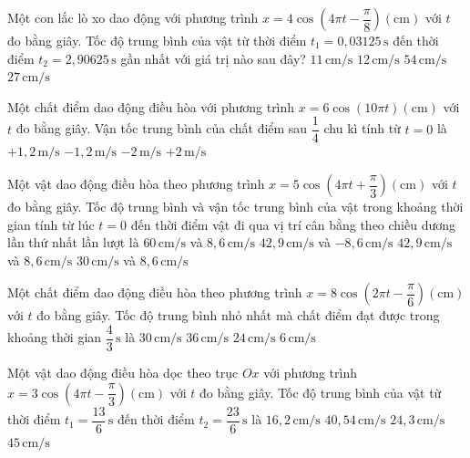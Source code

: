 \begin{ex}
Một con lắc lò xo dao động với phương trình
$x=4\cos\left(4\pi t-\dfrac{\pi}{8}\right) (\mathrm{cm})$
với $t$ đo bằng giây. Tốc độ trung bình của vật từ thời điểm $t_1=0,03125\,\mathrm{s}$ đến thời điểm $t_2=2,90625\,\mathrm{s}$ gần nhất với giá trị nào sau đây?
\choice
{$11\,\mathrm{cm/s}$}
{$12\,\mathrm{cm/s}$}
{$54\,\mathrm{cm/s}$}
{\True $27\,\mathrm{cm/s}$}
\end{ex}

\begin{ex}
Một chất điểm dao động điều hòa với phương trình
$x=6\cos(10\pi t) (\mathrm{cm})$
với $t$ đo bằng giây. Vận tốc trung bình của chất điểm sau $\dfrac{1}{4}$ chu kì tính từ $t=0$ là
\choice
{$+1,2\,\mathrm{m/s}$}
{\True $-1,2\,\mathrm{m/s}$}
{$-2\,\mathrm{m/s}$}
{$+2\,\mathrm{m/s}$}
\end{ex}

\begin{ex}
Một vật dao động điều hòa theo phương trình
$x=5\cos\left(4\pi t+\dfrac{\pi}{3}\right) (\mathrm{cm})$
với $t$ đo bằng giây. Tốc độ trung bình và vận tốc trung bình của vật trong khoảng thời gian tính từ lúc $t=0$ đến thời điểm vật đi qua vị trí cân bằng theo chiều dương lần thứ nhất lần lượt là
\choice
{$60\,\mathrm{cm/s}$ và $8,6\,\mathrm{cm/s}$}
{\True $42,9\,\mathrm{cm/s}$ và $-8,6\,\mathrm{cm/s}$}
{$42,9\,\mathrm{cm/s}$ và $8,6\,\mathrm{cm/s}$}
{$30\,\mathrm{cm/s}$ và $8,6\,\mathrm{cm/s}$}
\end{ex}

\begin{ex}
Một chất điểm dao động điều hòa theo phương trình
$x=8\cos\left(2\pi t-\dfrac{\pi}{6}\right) (\mathrm{cm})$
với $t$ đo bằng giây. Tốc độ trung bình nhỏ nhất mà chất điểm đạt được trong khoảng thời gian $\dfrac{4}{3}\,\mathrm{s}$ là
\choice
{\True $30\,\mathrm{cm/s}$}
{$36\,\mathrm{cm/s}$}
{$24\,\mathrm{cm/s}$}
{$6\,\mathrm{cm/s}$}
\end{ex}

\begin{ex}
Một vật dao động điều hòa dọc theo trục $Ox$ với phương trình
$x=3\cos\left(4\pi t-\dfrac{\pi}{3}\right) (\mathrm{cm})$
với $t$ đo bằng giây. Tốc độ trung bình của vật từ thời điểm $t_1=\dfrac{13}{6}\,\mathrm{s}$ đến thời điểm $t_2=\dfrac{23}{6}\,\mathrm{s}$ là
\choice
{$16,2\,\mathrm{cm/s}$}
{$40,54\,\mathrm{cm/s}$}
{\True $24,3\,\mathrm{cm/s}$}
{$45\,\mathrm{cm/s}$}
\end{ex}

